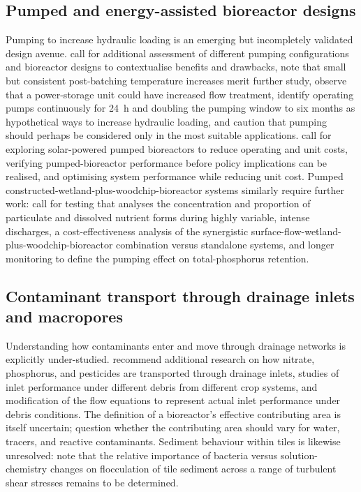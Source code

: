 \subsection{Pumped and energy-assisted bioreactor designs}
Pumping to increase hydraulic loading is an emerging but incompletely validated design avenue. \textcite{DíazGarcía2025} call for additional assessment of different pumping configurations and bioreactor designs to contextualise benefits and drawbacks, note that small but consistent post-batching temperature increases merit further study, observe that a power-storage unit could have increased flow treatment, identify operating pumps continuously for 24~h and doubling the pumping window to six months as hypothetical ways to increase hydraulic loading, and caution that pumping should perhaps be considered only in the most suitable applications. \textcite{Hartfiel2024} call for exploring solar-powered pumped bioreactors to reduce operating and unit costs, verifying pumped-bioreactor performance before policy implications can be realised, and optimising system performance while reducing unit cost. Pumped constructed-wetland-plus-woodchip-bioreactor systems similarly require further work: \textcite{Pugliese2020} call for testing that analyses the concentration and proportion of particulate and dissolved nutrient forms during highly variable, intense discharges, a cost-effectiveness analysis of the synergistic surface-flow-wetland-plus-woodchip-bioreactor combination versus standalone systems, and longer monitoring to define the pumping effect on total-phosphorus retention.

\subsection{Contaminant transport through drainage inlets and macropores}
Understanding how contaminants enter and move through drainage networks is explicitly under-studied. \textcite{Li2017b} recommend additional research on how nitrate, phosphorus, and pesticides are transported through drainage inlets, studies of inlet performance under different debris from different crop systems, and modification of the flow equations to represent actual inlet performance under debris conditions. The definition of a bioreactor's effective contributing area is itself uncertain; \textcite{Akay2008} question whether the contributing area should vary for water, tracers, and reactive contaminants. Sediment behaviour within tiles is likewise unresolved: \textcite{Stone1997} note that the relative importance of bacteria versus solution-chemistry changes on flocculation of tile sediment across a range of turbulent shear stresses remains to be determined.

